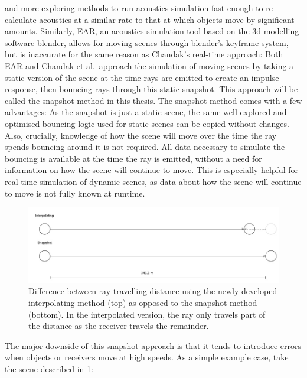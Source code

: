 and more exploring methods to run acoustics simulation fast enough
to re-calculate acoustics at a similar rate to that at which objects move by significant amounts.
\newline
Similarly, EAR, an acoustics simulation tool based on the 3d modelling software blender,
allows for moving scenes through blender's keyframe system,
but is inaccurate for the same reason as Chandak's real-time approach:
\newline
Both EAR and Chandak et al.\ approach the simulation of moving scenes by taking a static version of the scene
at the time rays are emitted to create an impulse response,
then bouncing rays through this static snapshot.
This approach will be called the snapshot method in this thesis.
\newline
The snapshot method comes with a few advantages:
As the snapshot is just a static scene,
the same well-explored and -optimised bouncing logic used for static scenes can be copied without changes.
Also, crucially, knowledge of how the scene will move over the time the ray spends bouncing around it is not required.
All data necessary to simulate the bouncing is available at the time the ray is emitted,
without a need for information on how the scene will continue to move.
This is especially helpful for real-time simulation of dynamic scenes, as data about how the scene will continue to move is not
fully known at runtime.
\newline
\begin{figure}
    \includegraphics[width=\linewidth]{images/snapshot_explain.jpg}
    \caption{Difference between ray travelling distance using the newly developed interpolating method (top) as opposed to the snapshot method (bottom). In the interpolated version, the ray only travels part of the distance as the receiver travels the remainder.}
    \label{SnapshotExplain}
\end{figure}
The major downside of this snapshot approach is that it tends to introduce errors when objects or receivers move at high speeds.
As a simple example case, take the scene described in \ref{SnapshotExplain}:
